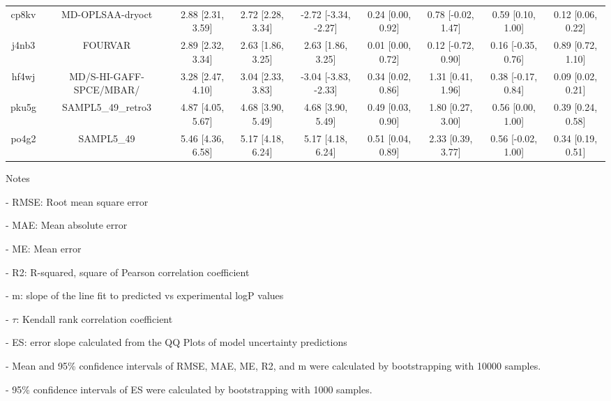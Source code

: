 \documentclass{article}
\begin{document}
\begin{center}
\begin{longtable}{|ccccccccc|}
 cp8kv &                                   MD-OPLSAA-dryoct &  2.88 [2.31, 3.59] &  2.72 [2.28, 3.34] &  -2.72 [-3.34, -2.27] &  0.24 [0.00, 0.92] &   0.78 [-0.02, 1.47] &    0.59 [0.10, 1.00] &     0.12 [0.06, 0.22] \\
 j4nb3 &                                            FOURVAR &  2.89 [2.32, 3.34] &  2.63 [1.86, 3.25] &     2.63 [1.86, 3.25] &  0.01 [0.00, 0.72] &   0.12 [-0.72, 0.90] &   0.16 [-0.35, 0.76] &     0.89 [0.72, 1.10] \\
 hf4wj &                            MD/S-HI-GAFF-SPCE/MBAR/ &  3.28 [2.47, 4.10] &  3.04 [2.33, 3.83] &  -3.04 [-3.83, -2.33] &  0.34 [0.02, 0.86] &    1.31 [0.41, 1.96] &   0.38 [-0.17, 0.84] &     0.09 [0.02, 0.21] \\
 pku5g &                                 SAMPL5\_49\_retro3 &  4.87 [4.05, 5.67] &  4.68 [3.90, 5.49] &     4.68 [3.90, 5.49] &  0.49 [0.03, 0.90] &    1.80 [0.27, 3.00] &    0.56 [0.00, 1.00] &     0.39 [0.24, 0.58] \\
 po4g2 &                                         SAMPL5\_49 &  5.46 [4.36, 6.58] &  5.17 [4.18, 6.24] &     5.17 [4.18, 6.24] &  0.51 [0.04, 0.89] &    2.33 [0.39, 3.77] &   0.56 [-0.02, 1.00] &     0.34 [0.19, 0.51] \\
\end{longtable}
\end{center}

Notes

- RMSE: Root mean square error

- MAE: Mean absolute error

- ME: Mean error

- R2: R-squared, square of Pearson correlation coefficient

- m: slope of the line fit to predicted vs experimental logP values

- $\tau$:  Kendall rank correlation coefficient

- ES: error slope calculated from the QQ Plots of model uncertainty predictions

- Mean and 95\% confidence intervals of RMSE, MAE, ME, R2, and m were calculated by bootstrapping with 10000 samples.

- 95\% confidence intervals of ES were calculated by bootstrapping with 1000 samples.\end{document}
\end{document}
